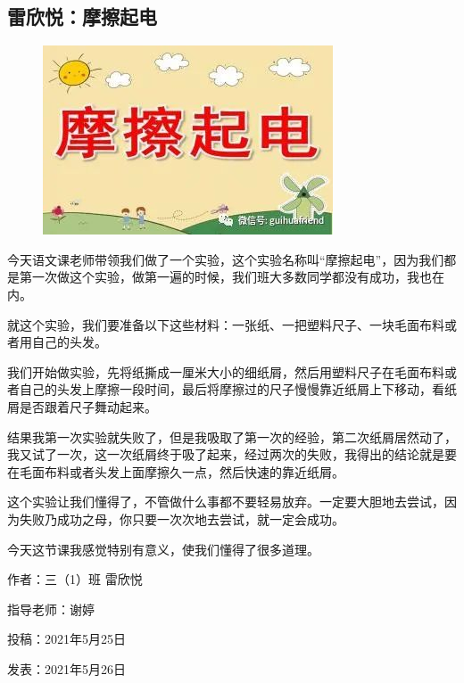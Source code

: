 \vspace{10pt}

{\centering\subsection*{雷欣悦：摩擦起电}}


\renewcommand{\leftmark}{雷欣悦：摩擦起电}

\begin{figure}[htbp]

\centering

\includegraphics[width = .5\textwidth]{./ch/16.jpg}

\end{figure}





今天语文课老师带领我们做了一个实验，这个实验名称叫“摩擦起电”，因为我们都是第一次做这个实验，做第一遍的时候，我们班大多数同学都没有成功，我也在内。

就这个实验，我们要准备以下这些材料：一张纸、一把塑料尺子、一块毛面布料或者用自己的头发。

我们开始做实验，先将纸撕成一厘米大小的细纸屑，然后用塑料尺子在毛面布料或者自己的头发上摩擦一段时间，最后将摩擦过的尺子慢慢靠近纸屑上下移动，看纸屑是否跟着尺子舞动起来。

结果我第一次实验就失败了，但是我吸取了第一次的经验，第二次纸屑居然动了，我又试了一次，这一次纸屑终于吸了起来，经过两次的失败，我得出的结论就是要在毛面布料或者头发上面摩擦久一点，然后快速的靠近纸屑。

这个实验让我们懂得了，不管做什么事都不要轻易放弃。一定要大胆地去尝试，因为失败乃成功之母，你只要一次次地去尝试，就一定会成功。

今天这节课我感觉特别有意义，使我们懂得了很多道理。





\vspace{10pt}



作者：三（1）班 雷欣悦



指导老师：谢婷



投稿：2021年5月25日



发表：2021年5月26日






                



\vspace{10pt}

\hline



